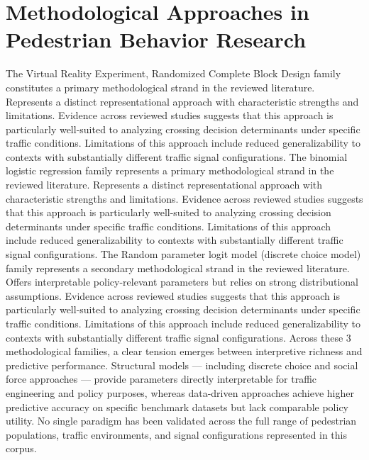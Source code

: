 \documentclass{article}
\begin{document}
\section{Methodological Approaches in Pedestrian Behavior Research}
The Virtual Reality Experiment, Randomized Complete Block Design family constitutes a primary methodological strand in the reviewed literature. Represents a distinct representational approach with characteristic strengths and limitations. Evidence across reviewed studies suggests that this approach is particularly well-suited to analyzing crossing decision determinants under specific traffic conditions. Limitations of this approach include reduced generalizability to contexts with substantially different traffic signal configurations. The binomial logistic regression family represents a primary methodological strand in the reviewed literature. Represents a distinct representational approach with characteristic strengths and limitations. Evidence across reviewed studies suggests that this approach is particularly well-suited to analyzing crossing decision determinants under specific traffic conditions. Limitations of this approach include reduced generalizability to contexts with substantially different traffic signal configurations. The Random parameter logit model (discrete choice model) family represents a secondary methodological strand in the reviewed literature. Offers interpretable policy-relevant parameters but relies on strong distributional assumptions. Evidence across reviewed studies suggests that this approach is particularly well-suited to analyzing crossing decision determinants under specific traffic conditions. Limitations of this approach include reduced generalizability to contexts with substantially different traffic signal configurations. Across these 3 methodological families, a clear tension emerges between interpretive richness and predictive performance. Structural models — including discrete choice and social force approaches — provide parameters directly interpretable for traffic engineering and policy purposes, whereas data-driven approaches achieve higher predictive accuracy on specific benchmark datasets but lack comparable policy utility. No single paradigm has been validated across the full range of pedestrian populations, traffic environments, and signal configurations represented in this corpus.
\end{document}
